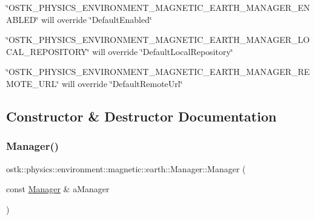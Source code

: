 \begin{DoxyItemize}
\item \char`\"{}\+O\+S\+T\+K\+\_\+\+P\+H\+Y\+S\+I\+C\+S\+\_\+\+E\+N\+V\+I\+R\+O\+N\+M\+E\+N\+T\+\_\+\+M\+A\+G\+N\+E\+T\+I\+C\+\_\+\+E\+A\+R\+T\+H\+\_\+\+M\+A\+N\+A\+G\+E\+R\+\_\+\+E\+N\+A\+B\+L\+E\+D\char`\"{} will override \char`\"{}\+Default\+Enabled\char`\"{}
\item \char`\"{}\+O\+S\+T\+K\+\_\+\+P\+H\+Y\+S\+I\+C\+S\+\_\+\+E\+N\+V\+I\+R\+O\+N\+M\+E\+N\+T\+\_\+\+M\+A\+G\+N\+E\+T\+I\+C\+\_\+\+E\+A\+R\+T\+H\+\_\+\+M\+A\+N\+A\+G\+E\+R\+\_\+\+L\+O\+C\+A\+L\+\_\+\+R\+E\+P\+O\+S\+I\+T\+O\+R\+Y\char`\"{} will override \char`\"{}\+Default\+Local\+Repository\char`\"{}
\item \char`\"{}\+O\+S\+T\+K\+\_\+\+P\+H\+Y\+S\+I\+C\+S\+\_\+\+E\+N\+V\+I\+R\+O\+N\+M\+E\+N\+T\+\_\+\+M\+A\+G\+N\+E\+T\+I\+C\+\_\+\+E\+A\+R\+T\+H\+\_\+\+M\+A\+N\+A\+G\+E\+R\+\_\+\+R\+E\+M\+O\+T\+E\+\_\+\+U\+R\+L\char`\"{} will override \char`\"{}\+Default\+Remote\+Url\char`\"{} 
\end{DoxyItemize}

\subsection{Constructor \& Destructor Documentation}
\mbox{\label{classostk_1_1physics_1_1environment_1_1magnetic_1_1earth_1_1_manager_a92c4248dd976fec3ab048a07a7265f9c}} 
\subsubsection{\texorpdfstring{Manager()}{Manager()}}
{\footnotesize\ttfamily ostk\+::physics\+::environment\+::magnetic\+::earth\+::\+Manager\+::\+Manager (\begin{DoxyParamCaption}\item[{const \hyperlink{classostk_1_1physics_1_1environment_1_1magnetic_1_1earth_1_1_manager}{Manager} \&}]{a\+Manager }\end{DoxyParamCaption})\hspace{0.3cm}{\ttfamily [delete]}}




